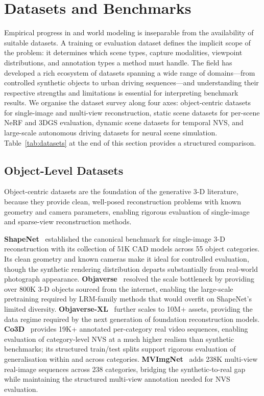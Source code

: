 \section{Datasets and Benchmarks}
\label{sec:datasets}

Empirical progress in \nvs{} and world modeling is inseparable from the
availability of suitable datasets.
A training or evaluation dataset defines the implicit scope of the problem:
it determines which scene types, capture modalities, viewpoint distributions,
and annotation types a method must handle.
The field has developed a rich ecosystem of datasets spanning a wide range of
domains---from controlled synthetic objects to urban driving sequences---and
understanding their respective strengths and limitations is essential for
interpreting benchmark results.
We organise the dataset survey along four axes: object-centric datasets
for single-image and multi-view reconstruction, static scene datasets for
per-scene NeRF and 3DGS evaluation, dynamic scene datasets for temporal NVS,
and large-scale autonomous driving datasets for neural scene simulation.
Table~\ref{tab:datasets} at the end of this section provides a structured comparison.

\subsection{Object-Level Datasets}

Object-centric datasets are the foundation of the generative 3-D literature,
because they provide clean, well-posed reconstruction problems with known
geometry and camera parameters, enabling rigorous evaluation of single-image
and sparse-view reconstruction methods.

\textbf{ShapeNet}~\citep{chang2015shapenet} established the canonical benchmark
for single-image 3-D reconstruction with its collection of 51K CAD models
across 55 object categories.
Its clean geometry and known cameras make it ideal for controlled evaluation,
though the synthetic rendering distribution departs substantially from real-world
photograph appearance.
\textbf{Objaverse}~\citep{deitke2023objaverse} resolved the scale bottleneck
by providing over 800K 3-D objects sourced from the internet, enabling the
large-scale pretraining required by LRM-family methods that would overfit on
ShapeNet's limited diversity.
\textbf{Objaverse-XL}~\citep{deitke2024objaversexl} further scales to 10M+ assets,
providing the data regime required by the next generation of foundation reconstruction models.
\textbf{Co3D}~\citep{reizenstein2021co3d} provides 19K+ annotated per-category
real video sequences, enabling evaluation of category-level NVS at a much higher
realism than synthetic benchmarks; its structured train/test splits support
rigorous evaluation of generalisation within and across categories.
\textbf{MVImgNet}~\citep{yu2023mvimgnet} adds 238K multi-view real-image sequences
across 238 categories, bridging the synthetic-to-real gap while maintaining
the structured multi-view annotation needed for NVS evaluation.

